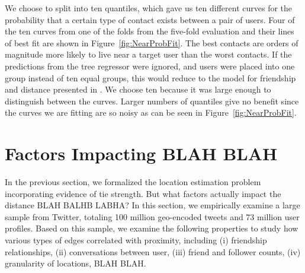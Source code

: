 \documentclass[letterpaper]{article}
\begin{document}
We choose to split into ten quantiles, which gave us ten different curves for the probability that a certain type of contact exists between a pair of users.  Four of the ten curves from one of the folds from the five-fold evaluation and their lines of best fit are shown in Figure~\ref{fig:NearProbFit}. The best contacts are orders of magnitude more likely to live near a target user than the worst contacts. If the predictions from the tree regressor were ignored, and users were placed into one group instead of ten equal groups, this would reduce to the model for friendship and distance presented in \cite{backstrom2010find}. We choose ten because it was large enough to distinguish between the curves.  Larger numbers of quantiles give no benefit since the curves we are fitting are so noisy as can be seen in Figure~\ref{fig:NearProbFit}.










\section{Factors Impacting BLAH BLAH}
In the previous section, we formalized the location estimation problem incorporating evidence of tie strength. But what factors actually impact the distance BLAH BALHB LABHA? In this section, we empirically examine a large sample from Twitter, totaling 100 million geo-encoded tweets and 73 million user profiles. Based on this sample, we examine the following properties to study how various types of edges correlated with proximity, including (i) friendship relationships, (ii) conversations between user, (iii) friend and follower counts, (iv) granularity of locations, BLAH BLAH.

\end{document}
